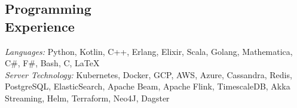 \documentclass[margin,line]{resume}
\begin{document}
\begin{resume}
\section{\mysidestyle Programming\\Experience}

\emph{Languages:} Python, Kotlin, C++, Erlang, Elixir, Scala, Golang, Mathematica,  C\#, F\#,
Bash, C, \LaTeX \\
\emph{Server Technology:} Kubernetes, Docker, GCP, AWS, Azure, Cassandra, Redis,
PostgreSQL, ElasticSearch, Apache Beam, Apache Flink, TimescaleDB, Akka Streaming,
Helm, Terraform, Neo4J, Dagster

\end{resume}
\end{document}
